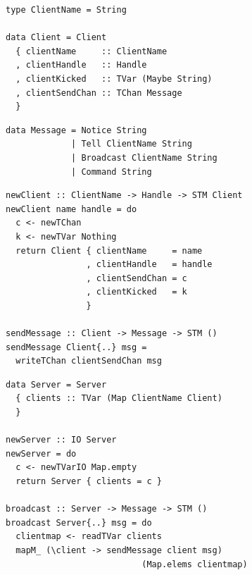 \documentclass{beamer}
\begin{document}

\begin{frame}[fragile]

\begin{verbatim}
type ClientName = String

data Client = Client
  { clientName     :: ClientName
  , clientHandle   :: Handle
  , clientKicked   :: TVar (Maybe String)
  , clientSendChan :: TChan Message
  }
\end{verbatim}
\pause

\begin{verbatim}
data Message = Notice String
             | Tell ClientName String
             | Broadcast ClientName String
             | Command String
\end{verbatim}
\end{frame}


\begin{frame}[fragile]

\begin{verbatim}
newClient :: ClientName -> Handle -> STM Client
newClient name handle = do
  c <- newTChan
  k <- newTVar Nothing
  return Client { clientName     = name
                , clientHandle   = handle
                , clientSendChan = c
                , clientKicked   = k
                }
                
sendMessage :: Client -> Message -> STM ()
sendMessage Client{..} msg =
  writeTChan clientSendChan msg
\end{verbatim}

\end{frame}


\begin{frame}[fragile]

\begin{verbatim}
data Server = Server
  { clients :: TVar (Map ClientName Client)
  }

newServer :: IO Server
newServer = do
  c <- newTVarIO Map.empty
  return Server { clients = c }
  
broadcast :: Server -> Message -> STM ()
broadcast Server{..} msg = do
  clientmap <- readTVar clients
  mapM_ (\client -> sendMessage client msg)
                           (Map.elems clientmap)
\end{verbatim}

\end{frame}
\end{document}
